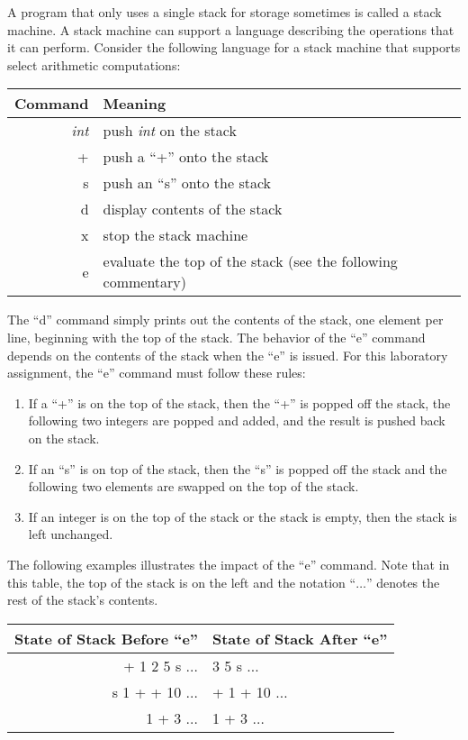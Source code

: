   A program that only uses a single stack for storage sometimes is called a stack machine. A stack machine can support a
  language describing the operations that it can perform. Consider the following language for a stack machine that
  supports select arithmetic computations:

\begin{tabular}{r | l}
Command & Meaning \\ \hline
\emph{int} & push \emph{int} on the stack \\
+ & push a ``+'' onto the stack \\
s & push an ``s'' onto the stack \\
d & display contents of the stack \\
x & stop the stack machine \\
e & evaluate the top of the stack (see the following commentary) \\
\end{tabular}

  The ``d'' command simply prints out the contents of the stack, one element per line, beginning with the top of the
  stack. The behavior of the ``e'' command depends on the contents of the stack when the ``e'' is issued. For this
  laboratory assignment, the ``e'' command must follow these rules:

\begin{enumerate}

  \item If a ``+'' is on the top of the stack, then the ``+'' is popped off the stack, the following two integers are
    popped and added, and the result is pushed back on the stack.

  \item If an ``s'' is on top of the stack, then the ``s'' is popped off the stack and the following two elements are
    swapped on the top of the stack.

  \item If an integer is on the top of the stack or the stack is empty, then the stack is left unchanged.

\end{enumerate}

The following examples illustrates the impact of the ``e'' command. Note that in this table, the top of the stack is on
the left and the notation ``$\ldots$'' denotes the rest of the stack's contents.

\begin{tabular}{r | l}
State of Stack Before ``e'' & State of Stack After ``e'' \\ \hline
+ 1 2 5 s $\ldots$  & 3 5 s $\ldots$ \\
s 1 + + 10 $\ldots$ & + 1 + 10 $\ldots$ \\
1 + 3 $\ldots$      & 1 + 3 $\ldots$ \\
\end{tabular}

